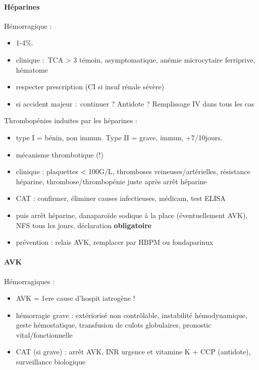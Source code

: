 \paragraph{Héparines}
Hémorragique : 
\begin{itemize}
  \item 1-4\%.
  \item clinique : TCA > 3 témoin, asymptomatique, anémie microcytaire
    ferriprive, hématome
  \item respecter prescription (CI si insuf rénale sévère)
  \item si accident majeur : continuer ? Antidote ? Remplissage IV dans tous les
    cas
\end{itemize}
Thrombopénies induites par les héparines : 
\begin{itemize}
  \item type I = bénin, non immun. Type II = grave, immun, +7/10jours.
  \item mécanisme thrombotique (!)
  \item clinique : plaquettes < 100G/L, thromboses veineuses/artérielles,
    résistance héparine, thrombose/thrombopénie juste après arrêt héparine
  \item CAT : confirmer, éliminer causes infectieuses, médicam, test ELISA
  \item puis arrêt héparine, danaparoïde sodique à la place (éventuellement
    AVK), NFS tous les jours, déclaration \textbf{obligatoire} 
  \item prévention : relais AVK, remplacer par HBPM ou fondaparinux
\end{itemize}

\paragraph{AVK}
Hémorragiques : 
\begin{itemize}
  \item AVK = 1ere cause d'hospit iatrogène !
  \item hémorragie grave : extériorisé non contrôlable, instabilité
    hémodynamique, geste hémostatique, transfusion de culots globulaires,
    pronostic vital/fonctionnelle
  \item CAT (si grave) : arrêt AVK, INR urgence et vitamine K + CCP (antidote),
    surveillance biologique
\end{itemize}








